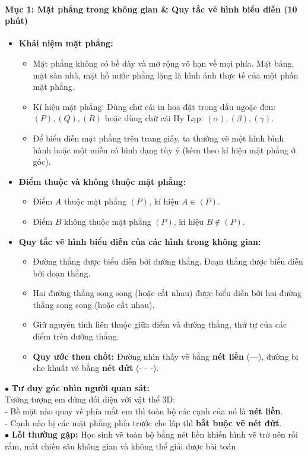 \documentclass[12pt, a4paper]{article}
\begin{document}
\paragraph{Mục 1: Mặt phẳng trong không gian & Quy tắc vẽ hình biểu diễn (10 phút)}
\begin{itemize}
    \item \textbf{Khái niệm mặt phẳng:}
    \begin{itemize}
        \item Mặt phẳng không có bề dày và mở rộng vô hạn về mọi phía. Mặt bảng, mặt sàn nhà, mặt hồ nước phẳng lặng là hình ảnh thực tế của một phần mặt phẳng.
        \item Kí hiệu mặt phẳng: Dùng chữ cái in hoa đặt trong dấu ngoặc đơn: $(P), (Q), (R)$ hoặc dùng chữ cái Hy Lạp: $(\alpha), (\beta), (\gamma)$.
        \item Để biểu diễn mặt phẳng trên trang giấy, ta thường vẽ một hình bình hành hoặc một miền có hình dạng tùy ý (kèm theo kí hiệu mặt phẳng ở góc).
    \end{itemize}
    \item \textbf{Điểm thuộc và không thuộc mặt phẳng:}
    \begin{itemize}
        \item Điểm $A$ thuộc mặt phẳng $(P)$, kí hiệu $A \in (P)$.
        \item Điểm $B$ không thuộc mặt phẳng $(P)$, kí hiệu $B \notin (P)$.
    \end{itemize}
    \item \textbf{Quy tắc vẽ hình biểu diễn của các hình trong không gian:}
    \begin{itemize}
        \item Đường thẳng được biểu diễn bởi đường thẳng. Đoạn thẳng được biểu diễn bởi đoạn thẳng.
        \item Hai đường thẳng song song (hoặc cắt nhau) được biểu diễn bởi hai đường thẳng song song (hoặc cắt nhau).
        \item Giữ nguyên tính liên thuộc giữa điểm và đường thẳng, thứ tự của các điểm trên đường thẳng.
        \item \textbf{Quy ước then chốt:} Đường nhìn thấy vẽ bằng \textbf{nét liền} (---), đường bị che khuất vẽ bằng \textbf{nét đứt} (- - -).
    \end{itemize}
\end{itemize}

\begin{scaffoldbox}
    $\bullet$ \textbf{Tư duy góc nhìn người quan sát:}\\
    Tưởng tượng em đứng đối diện với vật thể 3D:\\
    - Bề mặt nào quay về phía mắt em thì toàn bộ các cạnh của nó là \textbf{nét liền}.\\
    - Cạnh nào bị các mặt phẳng phía trước che lấp thì \textbf{bắt buộc vẽ nét đứt}.\\
    $\bullet$ \textbf{Lỗi thường gặp:} Học sinh vẽ toàn bộ bằng nét liền khiến hình vẽ trở nên rối rắm, mất chiều sâu không gian và không thể giải được bài toán.
\end{scaffoldbox}
\end{document}
